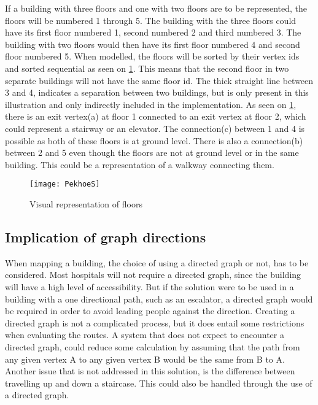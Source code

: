If a building with three floors and one with two floors are to be represented, the floors will be numbered 1 through 5. The building with the three floors could have its first floor numbered 1, second numbered 2 and third numbered 3. The building with two floors would then have its first floor numbered 4 and second floor numbered 5. When modelled, the floors will be sorted by their vertex ids and sorted sequential as seen on \cref{fig:PekhoeS}. This means that the second floor in two separate buildings will not have the same floor id. The thick straight line between 3 and 4, indicates a separation between two buildings, but is only present in this illustration and only indirectly included in the implementation. As seen on \cref{fig:PekhoeS}, there is an exit vertex(a) at floor 1 connected to an exit vertex at floor 2, which could represent a stairway or an elevator. The connection(c) between 1 and 4 is possible as both of these floors is at ground level. There is also a connection(b) between 2 and 5 even though the floors are not at ground level or in the same building. This could be a representation of a walkway connecting them.


\begin{figure}[ht!]
    \centering
    \texttt{[image: PekhoeS]}
    \caption{Visual representation of floors}
    \label{fig:PekhoeS}
  \end{figure}


\subsection{Implication of graph directions}

When mapping a building, the choice of using a directed graph or not, has to be considered. Most hospitals will not require a directed graph, since the building will have a high level of accessibility. But if the solution were to be used in a building with a one directional path, such as an escalator, a directed graph would be required in order to avoid leading people against the direction. Creating a directed graph is not a complicated process, but it does entail some restrictions when evaluating the routes. A system that does not expect to encounter a directed graph, could reduce some calculation by assuming that the path from any given vertex A to any given vertex B would be the same from B to A. Another issue that is not addressed in this solution, is the difference between travelling up and down a staircase. This could also be handled through the use of a directed graph.





